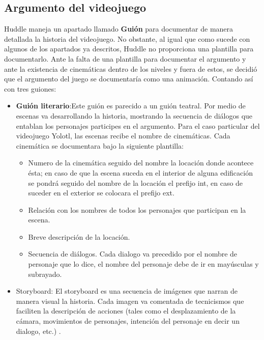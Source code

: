 \subsection{Argumento del videojuego}
Huddle maneja un apartado llamado \textbf{Guión} para documentar de manera detallada la historia del videojuego. No obstante, al igual que como sucede con algunos de los apartados ya descritos, Huddle no proporciona una plantilla para documentarlo. Ante la falta de una plantilla para documentar el argumento y ante la existencia de cinemáticas dentro de los niveles y fuera de estos, se decidió que el argumento del juego se documentaría como una animación. Contando así con tres guiones:
	\begin{itemize}
		\item \textbf{Guión literario}:Este guión es parecido a un guión teatral. Por medio de escenas va desarrollando la historia, mostrando la secuencia de diálogos que entablan los personajes participes en el argumento. Para el caso particular del videojuego Yolotl, las escenas recibe el nombre de cinemáticas. Cada cinemática se documentara bajo la siguiente plantilla:
			\begin{itemize}
				\item Numero de la cinemática seguido del nombre la locación donde acontece ésta; en caso de que la escena suceda en el interior de alguna edificación se pondrá seguido del nombre de la locación el prefijo int, en caso de suceder en el exterior se colocara el prefijo ext.
				\item Relación con los nombres de todos los personajes que participan en la escena.
				\item Breve descripción de la locación.
				\item Secuencia de diálogos. Cada dialogo va precedido por el nombre de personaje que lo dice, el nombre del personaje debe de ir en mayúsculas y subrayado. 
			\end{itemize}
			\item Storyboard: El storyboard es una secuencia de imágenes que narran de manera visual la historia. Cada imagen va comentada de tecnicismos que faciliten la descripción de acciones (tales como el desplazamiento de la cámara, movimientos de personajes, intención del personaje en decir un dialogo, etc.) \cite{Ref:StoyBoard}.  			 
	\end{itemize}